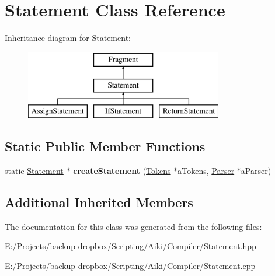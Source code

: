 \hypertarget{a00023}{\section{Statement Class Reference}
\label{a00023}
}
Inheritance diagram for Statement\+:\begin{figure}[H]
\begin{center}
\leavevmode
\includegraphics[height=3.000000cm]{d3/d52/a00023}
\end{center}
\end{figure}
\subsection*{Static Public Member Functions}
\begin{DoxyCompactItemize}
\item 
\hypertarget{a00023_a82dcbdec4ea18a7fe7b119b3d75944dc}{static \hyperlink{a00023}{Statement} $\ast$ {\bfseries create\+Statement} (\hyperlink{a00026}{Tokens} $\ast$a\+Tokens, \hyperlink{a00017}{Parser} $\ast$a\+Parser)}\label{a00023_a82dcbdec4ea18a7fe7b119b3d75944dc}

\end{DoxyCompactItemize}
\subsection*{Additional Inherited Members}


The documentation for this class was generated from the following files\+:\begin{DoxyCompactItemize}
\item 
E\+:/\+Projects/backup dropbox/\+Scripting/\+Aiki/\+Compiler/Statement.\+hpp\item 
E\+:/\+Projects/backup dropbox/\+Scripting/\+Aiki/\+Compiler/Statement.\+cpp\end{DoxyCompactItemize}
